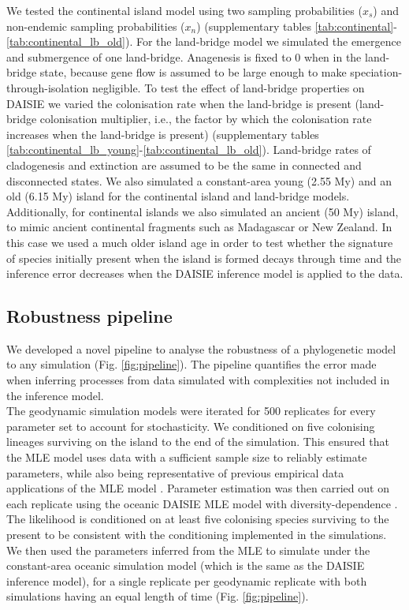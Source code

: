 \documentclass{article}
\begin{document}
We tested the continental island model using two sampling probabilities ($x_s$) and non-endemic sampling probabilities ($x_n$) (supplementary tables \ref{tab:continental}-\ref{tab:continental_lb_old}). For the land-bridge model we simulated the emergence and submergence of one land-bridge. Anagenesis is fixed to 0 when in the land-bridge state, because gene flow is assumed to be large enough to make speciation-through-isolation negligible. To test the effect of land-bridge properties on DAISIE we varied the colonisation rate when the land-bridge is present (land-bridge colonisation multiplier, i.e., the factor by which the colonisation rate increases when the land-bridge is present) (supplementary tables \ref{tab:continental_lb_young}-\ref{tab:continental_lb_old}). Land-bridge rates of cladogenesis and extinction are assumed to be the same in connected and disconnected states. We also simulated a constant-area young (2.55 My) and an old (6.15 My) island for the continental island and land-bridge models. Additionally, for continental islands we also simulated an ancient (50 My) island, to mimic ancient continental fragments such as Madagascar or New Zealand. In this case we used a much older island age in order to test whether the signature of species initially present when the island is formed decays through time and the inference error decreases when the DAISIE inference model is applied to the data. 

\subsection*{Robustness pipeline}

We developed a novel pipeline to analyse the robustness of a phylogenetic model to any simulation (Fig. \ref{fig:pipeline}). The pipeline quantifies the error made when inferring processes from data simulated with complexities not included in the inference model. \\

The geodynamic simulation models were iterated for 500 replicates for every parameter set to account for stochasticity. We conditioned on five colonising lineages surviving on the island to the end of the simulation. This ensured that the MLE model uses data with a sufficient sample size to reliably estimate parameters, while also being representative of previous empirical data applications of the MLE model \citep{valente_using_2018}. Parameter estimation was then carried out on each replicate using the oceanic DAISIE MLE model with diversity-dependence \citep{valente_equilibrium_2015}. The likelihood is conditioned on at least five colonising species surviving to the present to be consistent with the conditioning implemented in the simulations. We then used the parameters inferred from the MLE to simulate under the constant-area oceanic simulation model (which is the same as the DAISIE inference model), for a single replicate per geodynamic replicate with both simulations having an equal length of time (Fig. \ref{fig:pipeline}). 
\end{document}
